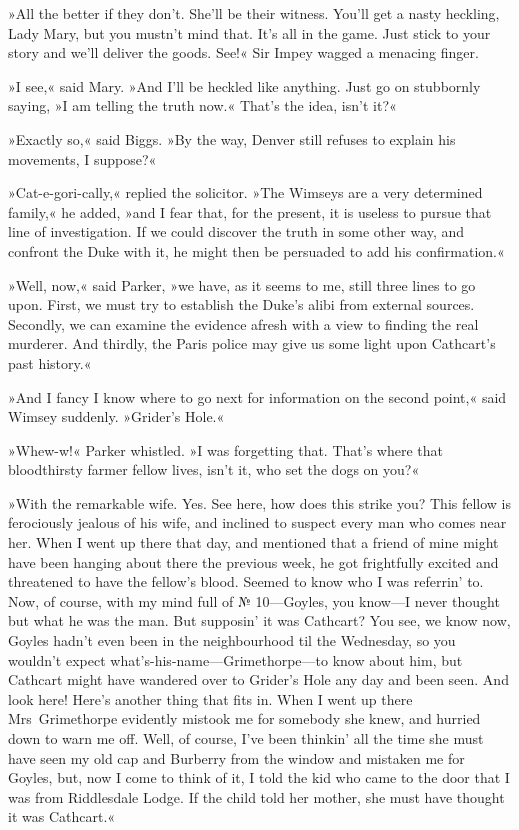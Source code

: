 »All the better if they don't. She'll be their witness. You'll get a nasty heckling, Lady Mary, but you mustn't mind that. It's all in the game. Just stick to your story and we'll deliver the goods. See!« Sir Impey wagged a menacing finger.

»I see,« said Mary. »And I'll be heckled like anything. Just go on stubbornly saying, »I am telling the truth now.« That's the idea, isn't it?«

»Exactly so,« said Biggs. »By the way, Denver still refuses to explain his movements, I suppose?«

»Cat-e-gori-cally,« replied the solicitor. »The Wimseys are a very determined family,« he added, »and I fear that, for the present, it is useless to pursue that line of investigation. If we could discover the truth in some other way, and confront the Duke with it, he might then be persuaded to add his confirmation.«

»Well, now,« said Parker, »we have, as it seems to me, still three lines to go upon. First, we must try to establish the Duke's alibi from external sources. Secondly, we can examine the evidence afresh with a view to finding the real murderer. And thirdly, the Paris police may give us some light upon Cathcart's past history.«

»And I fancy I know where to go next for information on the second point,« said Wimsey suddenly. »Grider's Hole.«

»Whew-w!« Parker whistled. »I was forgetting that. That's where that bloodthirsty farmer fellow lives, isn't it, who set the dogs on you?«

»With the remarkable wife. Yes. See here, how does this strike you?  This fellow is ferociously jealous of his wife, and inclined to suspect every man who comes near her. When I went up there that day, and mentioned that a friend of mine might have been hanging about there the previous week, he got frightfully excited and threatened to have the fellow's blood. Seemed to know who I was referrin' to. Now, of course, with my mind full of № 10—Goyles, you know—I never thought but what he was the man. But supposin' it was Cathcart? You see, we know now, Goyles hadn't even been in the neighbourhood til the Wednesday, so you wouldn't expect what's-his-name—Grimethorpe—to know about him, but Cathcart might have wandered over to Grider's Hole any day and been seen. And look here! Here's another thing that fits in. When I went up there Mrs~Grimethorpe evidently mistook me for somebody she knew, and hurried down to warn me off. Well, of course, I've been thinkin' all the time she must have seen my old cap and Burberry from the window and mistaken me for Goyles, but, now I come to think of it, I told the kid who came to the door that I was from Riddlesdale Lodge. If the child told her mother, she must have thought it was Cathcart.«

